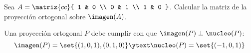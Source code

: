 \begin{enunciado}{\ejercicio}
  Sea $A =
    \matriz{cc}{
      1 & 0 \\
      0 & 1 \\
      1 & 0
    }
  $. Calcular la matriz de la proyección ortogonal sobre $\imagen(A)$.
\end{enunciado}

Una proyección ortogonal $P$ debe cumplir con que $\imagen(P) \perp \nucleo(P)$:
$$
  \imagen(P) = \set{(1, 0, 1), (0, 1, 0)}
  \ytext
  \nucleo(P) = \set{(-1, 0, 1)}
$$
